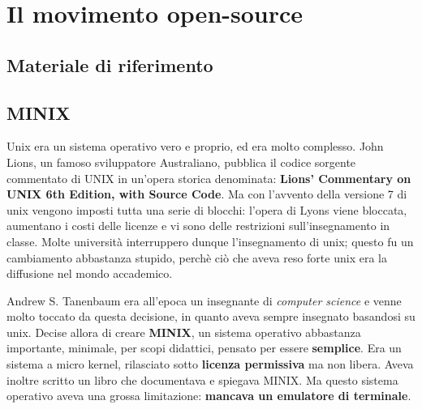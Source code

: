 \section{Il movimento open-source}

\subsection{Materiale di riferimento}


\subsection{MINIX}

Unix era un sistema operativo vero e proprio, ed era molto complesso. John Lions, un famoso sviluppatore Australiano, pubblica il codice sorgente commentato di UNIX in un'opera storica denominata: \textbf{Lions' Commentary on UNIX 6th Edition, with Source Code}. Ma con l'avvento della versione 7 di unix vengono imposti tutta una serie di blocchi: l'opera di Lyons viene bloccata, aumentano i costi delle licenze e vi sono delle restrizioni sull'insegnamento in classe. Molte università interruppero dunque l'insegnamento di unix; questo fu un cambiamento abbastanza stupido, perchè ciò che aveva reso forte unix era la diffusione nel mondo accademico. 

Andrew S. Tanenbaum era all'epoca un insegnante di \textit{computer science} e venne molto toccato da questa decisione, in quanto aveva sempre insegnato basandosi su unix. Decise allora di creare \textbf{MINIX}, un sistema operativo abbastanza importante, minimale, per scopi didattici, pensato per essere \textbf{semplice}. Era un sistema a micro kernel, rilasciato sotto \textbf{licenza permissiva} ma non libera. Aveva inoltre scritto un libro che documentava e spiegava MINIX. Ma questo sistema operativo aveva una grossa limitazione: \textbf{mancava un emulatore di terminale}.

